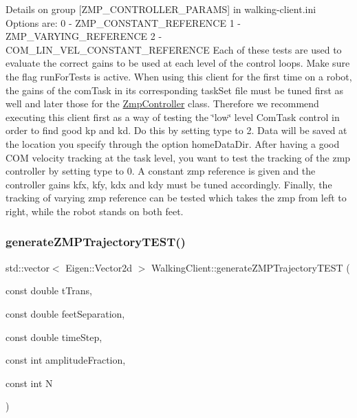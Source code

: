 Details on group \mbox{[}Z\+M\+P\+\_\+\+C\+O\+N\+T\+R\+O\+L\+L\+E\+R\+\_\+\+P\+A\+R\+A\+MS\mbox{]} in walking-\/client.\+ini Options are\+: 0 -\/ Z\+M\+P\+\_\+\+C\+O\+N\+S\+T\+A\+N\+T\+\_\+\+R\+E\+F\+E\+R\+E\+N\+CE 1 -\/ Z\+M\+P\+\_\+\+V\+A\+R\+Y\+I\+N\+G\+\_\+\+R\+E\+F\+E\+R\+E\+N\+CE 2 -\/ C\+O\+M\+\_\+\+L\+I\+N\+\_\+\+V\+E\+L\+\_\+\+C\+O\+N\+S\+T\+A\+N\+T\+\_\+\+R\+E\+F\+E\+R\+E\+N\+CE Each of these tests are used to evaluate the correct gains to be used at each level of the control loops. Make sure the flag \textquotesingle{}run\+For\+Tests\textquotesingle{} is active. When using this client for the first time on a robot, the gains of the com\+Task in its corresponding task\+Set file must be tuned first as well and later those for the \hyperlink{classZmpController}{Zmp\+Controller} class. Therefore we recommend executing this client first as a way of testing the \char`\"{}low\char`\"{} level Com\+Task control in order to find good kp and kd. Do this by setting \textquotesingle{}type\textquotesingle{} to 2. Data will be saved at the location you specify through the option \textquotesingle{}home\+Data\+Dir\textquotesingle{}. After having a good C\+OM velocity tracking at the task level, you want to test the tracking of the zmp controller by setting \textquotesingle{}type\textquotesingle{} to 0. A constant zmp reference is given and the controller gains kfx, kfy, kdx and kdy must be tuned accordingly. Finally, the tracking of varying zmp reference can be tested which takes the zmp from left to right, while the robot stands on both feet. \hypertarget{classWalkingClient_a3185a8ede8bf8b1227f7dd540ba87e3c}{}\label{classWalkingClient_a3185a8ede8bf8b1227f7dd540ba87e3c} 
\subsubsection{\texorpdfstring{generate\+Z\+M\+P\+Trajectory\+T\+E\+S\+T()}{generateZMPTrajectoryTEST()}}
{\footnotesize\ttfamily std\+::vector$<$ Eigen\+::\+Vector2d $>$ Walking\+Client\+::generate\+Z\+M\+P\+Trajectory\+T\+E\+ST (\begin{DoxyParamCaption}\item[{const double}]{t\+Trans,  }\item[{const double}]{feet\+Separation,  }\item[{const double}]{time\+Step,  }\item[{const int}]{amplitude\+Fraction,  }\item[{const int}]{N }\end{DoxyParamCaption})}


